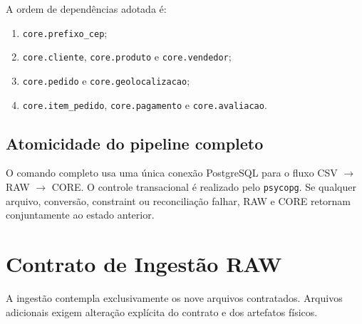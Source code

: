 \documentclass[12pt,a4paper]{article}
\begin{document}
	A ordem de dependências adotada é:
	
	\begin{enumerate}[leftmargin=1.2cm]
		\item \texttt{core.prefixo\_cep};
		\item \texttt{core.cliente}, \texttt{core.produto} e \texttt{core.vendedor};
		\item \texttt{core.pedido} e \texttt{core.geolocalizacao};
		\item \texttt{core.item\_pedido}, \texttt{core.pagamento} e \texttt{core.avaliacao}.
	\end{enumerate}
	
	\subsection{Atomicidade do pipeline completo}
	
	O comando completo usa uma única conexão PostgreSQL para o fluxo CSV
	$\rightarrow$ RAW $\rightarrow$ CORE. O controle transacional é realizado pelo
	\texttt{psycopg}. Se qualquer arquivo, conversão, constraint ou reconciliação
	falhar, RAW e CORE retornam conjuntamente ao estado anterior.
	
	\section{Contrato de Ingestão RAW}
	
	A ingestão contempla exclusivamente os nove arquivos contratados. Arquivos
	adicionais exigem alteração explícita do contrato e dos artefatos físicos.
	
\end{document}
